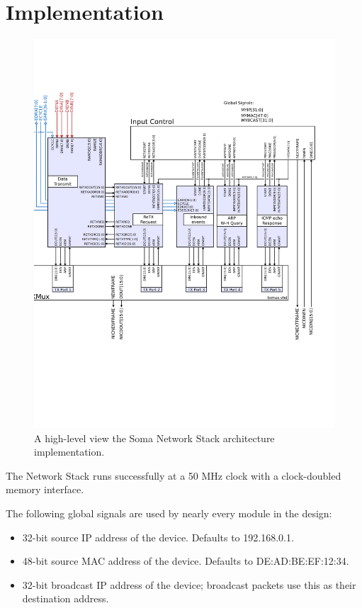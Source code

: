 \section{Implementation}

\begin{figure}
\begin{centering}
\includegraphics[scale=0.6]{overview.svg}
\end{centering}
\caption{A high-level view the Soma Network Stack architecture implementation.}
\label{overview}
\end{figure}

The Network Stack runs successfully at a 50 MHz clock with a
clock-doubled memory interface. 

The following global signals are used by nearly every module in the design: 

\begin{itemize}
\item {} 32-bit source IP address of the device. Defaults to 192.168.0.1. 
\item {} 48-bit source MAC address of the device. Defaults to DE:AD:BE:EF:12:34. 
\item {} 32-bit broadcast IP address of the device; broadcast packets use this as their destination address. 
\end{itemize}

